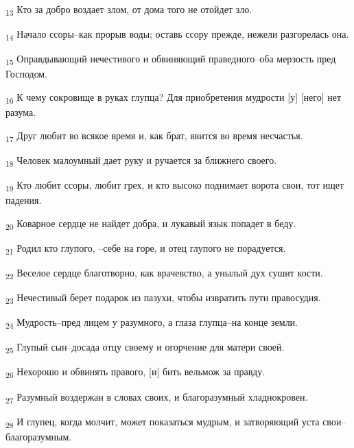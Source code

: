 \begin{tcolorbox}
\textsubscript{13} Кто за добро воздает злом, от дома того не отойдет зло.
\end{tcolorbox}
\begin{tcolorbox}
\textsubscript{14} Начало ссоры--как прорыв воды; оставь ссору прежде, нежели разгорелась она.
\end{tcolorbox}
\begin{tcolorbox}
\textsubscript{15} Оправдывающий нечестивого и обвиняющий праведного--оба мерзость пред Господом.
\end{tcolorbox}
\begin{tcolorbox}
\textsubscript{16} К чему сокровище в руках глупца? Для приобретения мудрости [у] [него] нет разума.
\end{tcolorbox}
\begin{tcolorbox}
\textsubscript{17} Друг любит во всякое время и, как брат, явится во время несчастья.
\end{tcolorbox}
\begin{tcolorbox}
\textsubscript{18} Человек малоумный дает руку и ручается за ближнего своего.
\end{tcolorbox}
\begin{tcolorbox}
\textsubscript{19} Кто любит ссоры, любит грех, и кто высоко поднимает ворота свои, тот ищет падения.
\end{tcolorbox}
\begin{tcolorbox}
\textsubscript{20} Коварное сердце не найдет добра, и лукавый язык попадет в беду.
\end{tcolorbox}
\begin{tcolorbox}
\textsubscript{21} Родил кто глупого, --себе на горе, и отец глупого не порадуется.
\end{tcolorbox}
\begin{tcolorbox}
\textsubscript{22} Веселое сердце благотворно, как врачевство, а унылый дух сушит кости.
\end{tcolorbox}
\begin{tcolorbox}
\textsubscript{23} Нечестивый берет подарок из пазухи, чтобы извратить пути правосудия.
\end{tcolorbox}
\begin{tcolorbox}
\textsubscript{24} Мудрость--пред лицем у разумного, а глаза глупца--на конце земли.
\end{tcolorbox}
\begin{tcolorbox}
\textsubscript{25} Глупый сын--досада отцу своему и огорчение для матери своей.
\end{tcolorbox}
\begin{tcolorbox}
\textsubscript{26} Нехорошо и обвинять правого, [и] бить вельмож за правду.
\end{tcolorbox}
\begin{tcolorbox}
\textsubscript{27} Разумный воздержан в словах своих, и благоразумный хладнокровен.
\end{tcolorbox}
\begin{tcolorbox}
\textsubscript{28} И глупец, когда молчит, может показаться мудрым, и затворяющий уста свои--благоразумным.
\end{tcolorbox}
